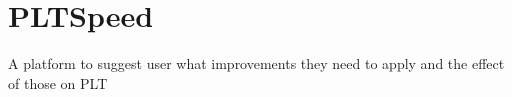 \chapter{PLTSpeed}\label{ch:pltspeed}
A platform to suggest user what improvements they need to apply and the effect of those on PLT